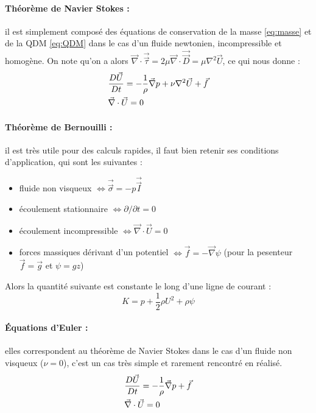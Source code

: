 \paragraph{Théorème de Navier Stokes :}il est simplement composé des équations de conservation de la masse \eqref{eq:masse} et de la QDM \eqref{eq:QDM} dans le cas d'un fluide newtonien, incompressible et homogène. On note qu'on a alors $\vec{\nabla} \cdot \vec{\vec{\tau}} = 2 \mu \vec{\nabla} \cdot \vec{\vec{D}} = \mu \nabla^2 \vec{U}$, ce qui nous donne :
%
\begin{align}[left=\empheqlbrace]
 \label{eq:navierstokes}  %
 & \frac{D\vec{U}}{Dt} = - \frac{1}{\rho} \vec{\nabla} p + \nu  \nabla^2 \vec{U} + \vec{f} \\
 \notag & \vec{\nabla} \cdot \vec{U} = 0
\end{align}


\paragraph{Théorème de Bernouilli :}il est très utile pour des calculs rapides, il faut bien retenir ses conditions d'application, qui sont les suivantes :

\begin{itemize}
    \item fluide non visqueux
    $\Leftrightarrow \vec{\vec{\sigma}}=-p\vec{\vec{I}}$
    \item écoulement stationnaire
    $\Leftrightarrow \partial{}/\partial{t} = 0$
    \item écoulement incompressible
    $\Leftrightarrow \vec{\nabla} \cdot \vec{U} = 0$
    \item forces massiques dérivant d'un potentiel
    $\Leftrightarrow\vec{f} = - \vec{\nabla} \psi$ (pour la pesenteur $\vec{f} = \vec{g}$ et $\psi = g z$)
\end{itemize}
%
Alors la quantité suivante est constante le long d'une ligne de courant :
%
\begin{equation}
K = p + \frac{1}{2}\rho U^2 + \rho\psi
\label{eq:bernouilli}
\end{equation}

\paragraph{Équations d'Euler :}elles correspondent au théorème de Navier Stokes dans le cas d'un fluide non visqueux ($\nu=0$), c'est un cas très simple et rarement rencontré en réalisé.
%
\begin{align}[left=\empheqlbrace]
 & \frac{D\vec{U}}{Dt} = - \frac{1}{\rho} \vec{\nabla} p + \vec{f} \\
 \notag & \vec{\nabla} \cdot \vec{U} = 0
\end{align}


